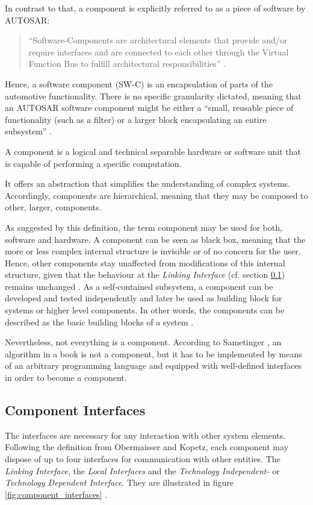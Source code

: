 In contrast to that, a component is explicitly referred to as a piece of software by \mbox{AUTOSAR}:	
\begin{quote}
``Software-Components are architectural elements that provide and/or require interfaces and are connected to each other through the Virtual Function Bus to fulfill architectural responsibilities'' \cite{autosar_glossary}.
\end{quote}

Hence, a software component (SW-C) is an encapsulation of parts of the automotive functionality. There is no specific granularity dictated, meaning that an \mbox{AUTOSAR} software component might be either a ``small, reusable piece of functionality (such as a filter) or a larger block encapsulating an entire subsystem'' \cite{autosar}.

\begin{myquote}
A component is a logical and technical separable hardware or software unit that is capable of performing a specific computation.

It offers an abstraction that simplifies the understanding of complex systems. Accordingly, components are hierarchical, meaning that they may be composed to other, larger, components.
\end{myquote}

As suggested by this definition, the term component may be used for both, software and hardware. A component can be seen as black box, meaning that the more or less complex internal structure is invisible or of no concern for the user. Hence, other components stay unaffected from modifications of this internal structure, given that the behaviour at the \emph{Linking Interface} (cf. section \ref{sec:component_interfaces}) remains unchanged \cite[p.38-39]{genesys} \cite{autosar_intro} \cite{sametinger}. As a self-contained subsystem, a component can be developed and tested independently and later be used as building block for systems or higher level components. In other words, the components can be described as the basic building blocks of a system \cite{ning}. 

Nevertheless, not everything is a component. According to Sametinger \cite[p.2-3]{sametinger}, an algorithm in a book is not a component, but it has to be implemented by means of an arbitrary programming language and equipped with well-defined interfaces in order to become a component.


\subsection{Component Interfaces}
\label{sec:component_interfaces}
The interfaces are necessary for any interaction with other system elements. Following the definition from Obermaisser and Kopetz, each component may dispose of up to four interfaces for communication with other entities. The \emph{Linking Interface}, the \emph{Local Interfaces} and the \emph{Technology Independent-} or \emph{Technology Dependent Interface}. They are illustrated in figure \ref{fig:component_interfaces} \cite[p.40-41]{genesys}.

